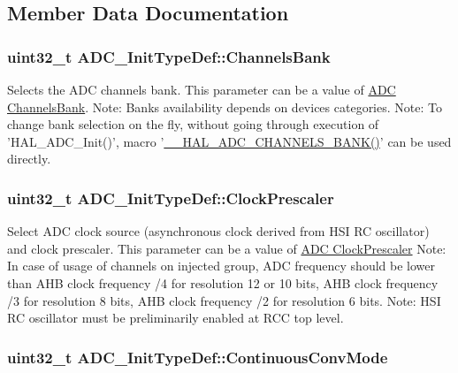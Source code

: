 \subsection{Member Data Documentation}
\hypertarget{struct_a_d_c___init_type_def_a0309138376012c68518fb9e5e88213cb}{
\subsubsection[{Channels\-Bank}]{\setlength{\rightskip}{0pt plus 5cm}uint32\-\_\-t A\-D\-C\-\_\-\-Init\-Type\-Def\-::\-Channels\-Bank}}\label{struct_a_d_c___init_type_def_a0309138376012c68518fb9e5e88213cb}
Selects the A\-D\-C channels bank. This parameter can be a value of \hyperlink{group___a_d_c___channels_bank}{A\-D\-C Channels\-Bank}. Note\-: Banks availability depends on devices categories. Note\-: To change bank selection on the fly, without going through execution of 'H\-A\-L\-\_\-\-A\-D\-C\-\_\-\-Init()', macro '\hyperlink{group___a_d_c_ex___exported___macros_gaefce3b3493d4fc37fc478adf542ee064}{\-\_\-\-\_\-\-H\-A\-L\-\_\-\-A\-D\-C\-\_\-\-C\-H\-A\-N\-N\-E\-L\-S\-\_\-\-B\-A\-N\-K()}' can be used directly. \hypertarget{struct_a_d_c___init_type_def_a7e49d0db9ef7db8806bbfa57a1bd73a6}{
\subsubsection[{Clock\-Prescaler}]{\setlength{\rightskip}{0pt plus 5cm}uint32\-\_\-t A\-D\-C\-\_\-\-Init\-Type\-Def\-::\-Clock\-Prescaler}}\label{struct_a_d_c___init_type_def_a7e49d0db9ef7db8806bbfa57a1bd73a6}
Select A\-D\-C clock source (asynchronous clock derived from H\-S\-I R\-C oscillator) and clock prescaler. This parameter can be a value of \hyperlink{group___a_d_c___clock_prescaler}{A\-D\-C Clock\-Prescaler} Note\-: In case of usage of channels on injected group, A\-D\-C frequency should be lower than A\-H\-B clock frequency /4 for resolution 12 or 10 bits, A\-H\-B clock frequency /3 for resolution 8 bits, A\-H\-B clock frequency /2 for resolution 6 bits. Note\-: H\-S\-I R\-C oscillator must be preliminarily enabled at R\-C\-C top level. \hypertarget{struct_a_d_c___init_type_def_a4bf957b8be6ae85d71e9376e6f1e633b}{
\subsubsection[{Continuous\-Conv\-Mode}]{\setlength{\rightskip}{0pt plus 5cm}uint32\-\_\-t A\-D\-C\-\_\-\-Init\-Type\-Def\-::\-Continuous\-Conv\-Mode}}\label{struct_a_d_c___init_type_def_a4bf957b8be6ae85d71e9376e6f1e633b}
